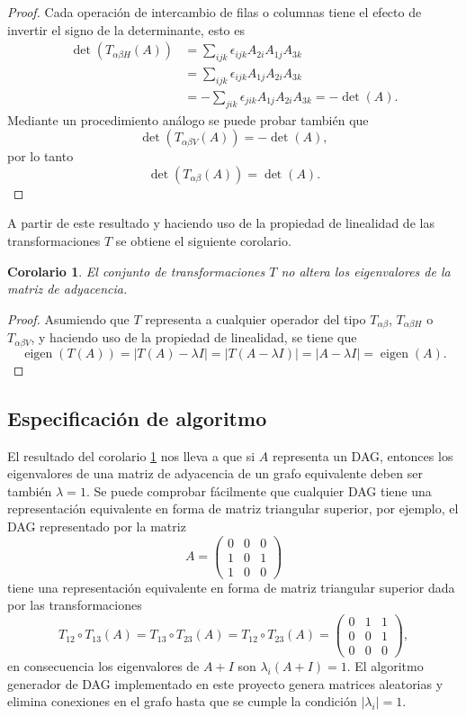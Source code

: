 \documentclass[10pt,a4paper]{article}
\newtheorem{corolario}{Corolario}[teorema1]
\begin{document}
\begin{proof}
Cada operación de intercambio de filas o columnas tiene el efecto de invertir el signo de la determinante, esto es
\begin{align*}
	\operatorname{det}\left( T_{\alpha \beta H}(A) \right) &= \sum_{ijk} \epsilon_{ijk} A_{2i} A_{1j} A_{3k} \\
	&= \sum_{ijk} \epsilon_{ijk} A_{1j} A_{2i} A_{3k} \\
	&= - \sum_{jik} \epsilon_{jik} A_{1j} A_{2i} A_{3k} = - \operatorname{det}(A).
\end{align*}
Mediante un procedimiento análogo se puede probar también que
\[
	\operatorname{det}\left( T_{\alpha \beta V}(A) \right) = - \operatorname{det}(A),
\]
por lo tanto
\[
	\operatorname{det}(T_{\alpha \beta} (A)) = \operatorname{det}(A).
\]

\end{proof}
A partir de este resultado y haciendo uso de la propiedad de linealidad de las transformaciones $T$ se obtiene el siguiente corolario.
\begin{corolario}
\label{cor1}
El conjunto de transformaciones $T$ no altera los eigenvalores de la matriz de adyacencia.
\end{corolario}
\begin{proof}
Asumiendo que $T$ representa a cualquier operador del tipo $T_{\alpha \beta}$, $T_{\alpha \beta H}$ o $T_{\alpha \beta V}$, y haciendo uso de la propiedad de linealidad, se tiene que
\[
	\operatorname{eigen}(T(A)) = |T(A) - \lambda I| = |T(A-\lambda I)| = |A-\lambda I| = \operatorname{eigen}(A).
\]
\end{proof}

\subsection{Especificación de algoritmo}
El resultado del corolario \ref{cor1} nos lleva a que si $A$ representa un DAG, entonces los eigenvalores de una matriz de adyacencia de un grafo equivalente deben ser también $\lambda = 1$. Se puede comprobar fácilmente que cualquier DAG tiene una representación equivalente en forma de matriz triangular superior, por ejemplo, el DAG representado por la matriz
\[
	A = \begin{pmatrix}
		0 & 0 & 0 \\
		1 & 0 & 1 \\
		1 & 0 & 0
	\end{pmatrix}
\]
tiene una representación equivalente en forma de matriz triangular superior dada por las transformaciones
\[
	T_{12} \circ T_{13} (A) = T_{13} \circ T_{23} (A) = T_{12} \circ T_{23} (A) = \begin{pmatrix}
		0 & 1 & 1 \\
		0 & 0 & 1 \\
		0 & 0 & 0
	\end{pmatrix},
\]
en consecuencia los eigenvalores de $A+I$ son $\lambda_i (A+I) = 1$.
El algoritmo generador de DAG implementado en este proyecto genera matrices aleatorias y elimina conexiones en el grafo hasta que se cumple la condición $|\lambda_i| = 1$.
\end{document}
